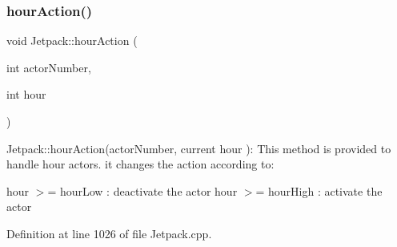 \subsubsection{\texorpdfstring{hour\+Action()}{hourAction()}}
{\footnotesize\ttfamily void Jetpack\+::hour\+Action (\begin{DoxyParamCaption}\item[{int}]{actor\+Number,  }\item[{int}]{hour }\end{DoxyParamCaption})}

Jetpack\+::hour\+Action(actor\+Number, current hour )\+: This method is provided to handle hour actors. it changes the action according to\+:

hour $>$= hour\+Low \+: deactivate the actor hour $>$= hour\+High \+: activate the actor 

Definition at line 1026 of file Jetpack.\+cpp.


